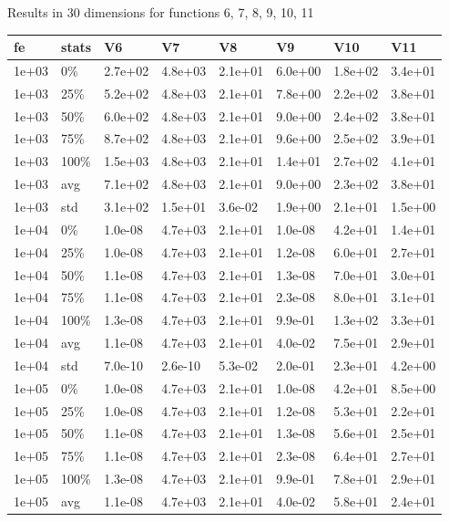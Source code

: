 \documentclass[11pt]{article}
\begin{document}
\newpage
Results in 30 dimensions for functions 6, 7, 8, 9, 10, 11
\begin{longtable}{llllllll}
  \hline
fe & stats & V6 & V7 & V8 & V9 & V10 & V11 \\ 
  \hline
1e+03 & 0\% & 2.7e+02 & 4.8e+03 & 2.1e+01 & 6.0e+00 & 1.8e+02 & 3.4e+01 \\ 
  1e+03 & 25\% & 5.2e+02 & 4.8e+03 & 2.1e+01 & 7.8e+00 & 2.2e+02 & 3.8e+01 \\ 
  1e+03 & 50\% & 6.0e+02 & 4.8e+03 & 2.1e+01 & 9.0e+00 & 2.4e+02 & 3.8e+01 \\ 
  1e+03 & 75\% & 8.7e+02 & 4.8e+03 & 2.1e+01 & 9.6e+00 & 2.5e+02 & 3.9e+01 \\ 
  1e+03 & 100\% & 1.5e+03 & 4.8e+03 & 2.1e+01 & 1.4e+01 & 2.7e+02 & 4.1e+01 \\ 
  1e+03 & avg & 7.1e+02 & 4.8e+03 & 2.1e+01 & 9.0e+00 & 2.3e+02 & 3.8e+01 \\ 
  1e+03 & std & 3.1e+02 & 1.5e+01 & 3.6e-02 & 1.9e+00 & 2.1e+01 & 1.5e+00 \\ 
  1e+04 & 0\% & 1.0e-08 & 4.7e+03 & 2.1e+01 & 1.0e-08 & 4.2e+01 & 1.4e+01 \\ 
  1e+04 & 25\% & 1.0e-08 & 4.7e+03 & 2.1e+01 & 1.2e-08 & 6.0e+01 & 2.7e+01 \\ 
  1e+04 & 50\% & 1.1e-08 & 4.7e+03 & 2.1e+01 & 1.3e-08 & 7.0e+01 & 3.0e+01 \\ 
  1e+04 & 75\% & 1.1e-08 & 4.7e+03 & 2.1e+01 & 2.3e-08 & 8.0e+01 & 3.1e+01 \\ 
  1e+04 & 100\% & 1.3e-08 & 4.7e+03 & 2.1e+01 & 9.9e-01 & 1.3e+02 & 3.3e+01 \\ 
  1e+04 & avg & 1.1e-08 & 4.7e+03 & 2.1e+01 & 4.0e-02 & 7.5e+01 & 2.9e+01 \\ 
  1e+04 & std & 7.0e-10 & 2.6e-10 & 5.3e-02 & 2.0e-01 & 2.3e+01 & 4.2e+00 \\ 
  1e+05 & 0\% & 1.0e-08 & 4.7e+03 & 2.1e+01 & 1.0e-08 & 4.2e+01 & 8.5e+00 \\ 
  1e+05 & 25\% & 1.0e-08 & 4.7e+03 & 2.1e+01 & 1.2e-08 & 5.3e+01 & 2.2e+01 \\ 
  1e+05 & 50\% & 1.1e-08 & 4.7e+03 & 2.1e+01 & 1.3e-08 & 5.6e+01 & 2.5e+01 \\ 
  1e+05 & 75\% & 1.1e-08 & 4.7e+03 & 2.1e+01 & 2.3e-08 & 6.4e+01 & 2.7e+01 \\ 
  1e+05 & 100\% & 1.3e-08 & 4.7e+03 & 2.1e+01 & 9.9e-01 & 7.8e+01 & 2.9e+01 \\ 
  1e+05 & avg & 1.1e-08 & 4.7e+03 & 2.1e+01 & 4.0e-02 & 5.8e+01 & 2.4e+01 \\ 

\end{longtable}
\end{document}
